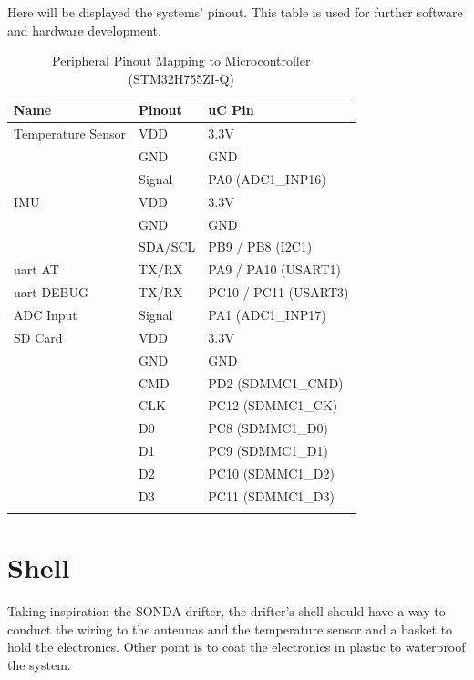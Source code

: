Here will be displayed the systems' pinout. This table is used for further software and hardware development.

\begin{table}[h!]
    \centering
    \small
    \begin{tabular}{l|l|l}
        \textbf{Name} & \textbf{Pinout} & \textbf{uC Pin} \\
        \hline
        \arrayrulecolor[gray]{0.85}
        Temperature Sensor & VDD & 3.3V \\
         & GND & GND \\
         & Signal & PA0 (ADC1\_INP16) \\
        \hline
        IMU & VDD & 3.3V \\
         & GND & GND \\
         & SDA/SCL & PB9 / PB8 (I2C1) \\
        \hline
        \acrshort{uart} AT & TX/RX & PA9 / PA10 (USART1) \\
        \hline
        \acrshort{uart} DEBUG & TX/RX & PC10 / PC11 (USART3) \\
        \hline
        ADC Input & Signal & PA1 (ADC1\_INP17) \\
        \hline
        SD Card & VDD & 3.3V \\
         & GND & GND \\
         & CMD & PD2 (SDMMC1\_CMD) \\
         & CLK & PC12 (SDMMC1\_CK) \\
         & D0 & PC8 (SDMMC1\_D0) \\
         & D1 & PC9 (SDMMC1\_D1) \\
         & D2 & PC10 (SDMMC1\_D2) \\
         & D3 & PC11 (SDMMC1\_D3) \\
        \arrayrulecolor{black}
    \end{tabular}
    \caption{Peripheral Pinout Mapping to Microcontroller (STM32H755ZI-Q)}
    \label{table:peripheral_pinout}
\end{table}
\section{Shell}

Taking inspiration the SONDA drifter, the drifter's shell should have a way to conduct the wiring to the 
antennas and the temperature sensor and a basket to hold the electronics. Other point is to coat the 
electronics in plastic to waterproof the system.

